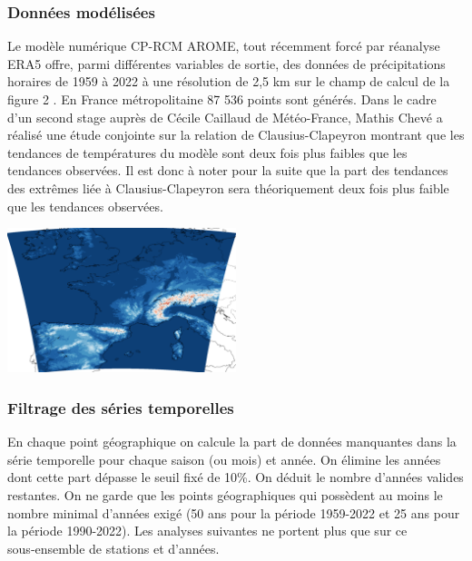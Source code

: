 \documentclass[
  article,
  nofooter,
  noheadings]{jss}
\begin{document}

\subsubsection{Données modélisées}\label{donnuxe9es-moduxe9lisuxe9es}

Le modèle numérique CP-RCM AROME, tout récemment forcé par réanalyse
ERA5 offre, parmi différentes variables de sortie, des données de
précipitations horaires de 1959 à 2022 à une résolution de 2,5 km sur le
champ de calcul de la figure 2 \citep{arome2014}. En France
métropolitaine 87 536 points sont générés. Dans le cadre d'un second
stage auprès de Cécile Caillaud de Météo-France, Mathis Chevé a réalisé
une étude conjointe sur la relation de Clausius-Clapeyron montrant que
les tendances de températures du modèle sont deux fois plus faibles que
les tendances observées. Il est donc à noter pour la suite que la part
des tendances des extrêmes liée à Clausius-Clapeyron sera théoriquement
deux fois plus faible que les tendances observées.

\hfill\break

\begin{center}
  \centering \includegraphics[width=0.5\textwidth]{figures/domaine_calcul_AROME.png}
\end{center}

\hfill\break
{}

\subsubsection{Filtrage des séries
temporelles}\label{filtrage-des-suxe9ries-temporelles}

En chaque point géographique on calcule la part de données manquantes
dans la série temporelle pour chaque saison (ou mois) et année. On
élimine les années dont cette part dépasse le seuil fixé de 10\%. On
déduit le nombre d'années valides restantes. On ne garde que les points
géographiques qui possèdent au moins le nombre minimal d'années exigé
(50 ans pour la période 1959-2022 et 25 ans pour la période 1990-2022).
Les analyses suivantes ne portent plus que sur ce sous‑ensemble de
stations et d'années.
\end{document}
